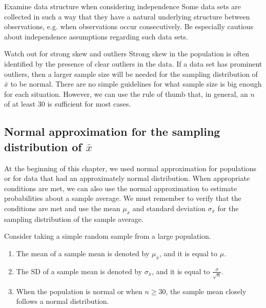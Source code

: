 \begin{caution}{Examine data structure when considering independence}
{Some data sets are collected in such a way that they have a natural underlying structure between observations, e.g. when observations occur consecutively. Be especially cautious about independence assumptions regarding such data sets.}
\end{caution}

\begin{caution}{Watch out for strong skew and outliers}
{Strong skew in the population is often identified by the presence of clear outliers in the data. If a data set has prominent outliers, then a larger sample size will be needed for the sampling distribution of $\bar{x}$ to be normal. There are no simple guidelines for what sample size is big enough for each situation. However, we can use the rule of thumb that, in general, an $n$ of at least 30 is sufficient for most cases.}
\end{caution}



\subsection{Normal approximation for the sampling distribution of $\bar{x}$}

At the beginning of this chapter, we used normal approximation for populations or for data that had an approximately normal distribution. When appropriate conditions are met, we can also use the normal approximation to estimate probabilities about a sample average. We must remember to verify that the conditions are met and use the mean $\mu_{\bar{x}}$ and standard deviation $\sigma_{\bar{x}}$ for the sampling distribution of the sample average.

\begin{tipBox}{
Consider taking a simple random sample from a large population.
\begin{enumerate}
\setlength{\itemsep}{0mm}
\item The mean of a sample mean is denoted by $\mu_{\bar{x}}$, and it is equal to $\mu$.
\item The SD of a sample mean is denoted by $\sigma_{\bar{x}}$, and it is equal to $\frac{\sigma}{\sqrt{n}}$.
\item When the population is normal or when $n\ge 30$, the sample mean closely follows a normal distribution. 
\end{enumerate}}
\end{tipBox}

